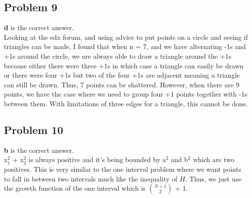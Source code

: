 \documentclass[12 pt]{article}
\begin{document}
	
	\subsection*{Problem 9}
	\textbf{d} is the correct answer. \\
	Looking at the edx forum, and using advice to put points on a circle and seeing if triangles can be made, I found that when n = 7, and we have alternating -1s and +1s around the circle, we are always able to draw a triangle around the +1s because either there were three +1s in which case a triangle can easily be drawn or there were four +1s but two of the four +1s are adjacent meaning a triangle can still be drawn. Thus, 7 points can be shattered. However, when there are 9 points, we have the case where we need to group four +1 points together with -1s between them. With limitations of three edges for a triangle, this cannot be done. 

	
	\subsection*{Problem 10}
	\textbf{b} is the correct answer. \\
	x$_1^2$ + x$_2^2$ is always positive and it's being bounded by a$^2$ and b$^2$ which are two positives. This is very similar to the one interval problem where we want points to fall in between two intervals much like the inequality of $H$. Thus, we just use the growth function of the one interval which is $\binom{N+1}{2}$ + 1.

	
\end{document}
